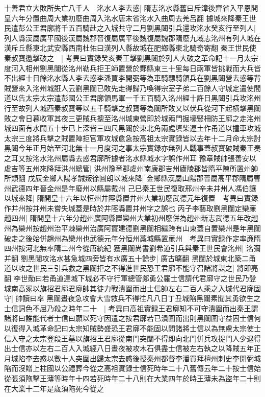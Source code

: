 十善君立大敗所失亡八千人　洺水人李去惑|{
	隋志洺水縣舊曰斥漳後齊省入平恩開皇六年分置曲周大業初廢曲周入洺水唐末省洺水入曲周去羌呂翻}
據城來降秦王世民遣彭公王君廓將千五百騎赴之入城共守二月劉黑闥引兵還攻洺水癸亥行至列人|{
	列人縣漢屬廣平國後漢屬魏郡晉復屬廣平後魏復屬魏郡隋廢九域志洺州有列人城在漢斥丘縣東北武安縣西南杜佑曰漢列人縣故城在肥鄉縣東北騎奇寄翻}
秦王世民使秦叔寶邀擊破之　|{
	考異曰實録癸亥秦王擊劉黑闥於列人大破之革命記十一月太宗度河入相州劉黑闥從洺州勒兵拒王師置營於鄴縣東三十里每日兩軍皆挑戰而大兵皆不出經十日餘洺水縣人李去惑李潘買李開弼等為車騎驃騎領兵在劉黑闥營去惑等背賊營來入洺州城誑人云劉黑闥已敗先走得歸乃喚得宗室子弟二百餘人守城定遣使間道以告太宗太宗遣彭國公王君廓領馬軍一千五百騎入洺州經十許日黑闥引兵攻洺州行至故列人城西秦叔寶等以五千騎擊之叔寶等為闥所敗又以伏兵從河下起横擊黑闥敗之會日暮收軍其夜三更賊兵摠至洺州城東營即於城兩門掘壕豎柵防王廓之走洺州城四面有水闊五十步已上深皆三四尺黑闥於東北角兩處填柴運土作甬道以撞車攻城太宗三度將兵擊之賊置陣拒官軍攻城愈急按高祖太宗實録皆以去年十二月命太宗討黑闥今年正月始至河北無十一月度河之事太宗實録亦無列人戰事蓋叔寶破賊秦王奏之耳又按洺水洺州屬縣去惑君廓所據者洺水縣城水字誤作州耳}
豫章賊帥張善安以䖍吉等五州來降拜洪州總管|{
	洪州豫章郡䖍州南康郡吉州廬陵郡皆隋平陳所置州帥所類翻}
戊辰金鄉人陽孝誠叛徐圓朗以城來降|{
	金鄉縣漢屬山陽郡晉屬高平郡隋屬曹州武德四年晉金州是年廢州以縣屬戴州}
己巳秦王世民復取邢州辛未井州人馮伯讓以城來降|{
	隋開皇十六年以恒州井陘縣置井州大業初廢武德元年復置　考異曰實録作并州按并州未嘗失城蓋是時於井陘縣置井州字之誤也}
丙子李藝取劉黑闥定欒亷趙四州|{
	隋開皇十六年分趙州廣阿縣置欒州大業初州廢併為趙州新志武德五年改趙州為欒州按趙州治平棘欒州治廣阿竇建德劉黑闥相繼跨有山東蓋自置欒州是年黑闥破走之後始併趙州為欒州也武德元年分恒州藁城縣置亷州　考異曰實録作定率亷隋四州按河北無率隋二州今從唐統紀}
獲黑闥尚書劉希道引兵與秦王世民會洺州|{
	洺彌并翻}
劉黑闥攻洺水甚急城四旁皆有水廣五十餘步|{
	廣古曠翻}
黑闥於城東北築二甬道以攻之世民三引兵救之黑闥拒之不得進世民恐王君廓不能守召諸將謀之|{
	將即亮翻}
李世勣曰若甬道達城下城必不守行軍總管郯勇公羅士信請代君廓守之世民乃登城南高冢以旗招君廓君廓帥其徒力戰潰圍而出士信帥左右二百人乘之入城代君廓固守|{
	帥讀曰率}
黑闥晝夜急攻會大雪救兵不得往凡八日丁丑城陷黑闥素聞其勇欲生之士信詞色不屈乃殺之時年二十　|{
	考異曰高祖實録王君廓知不可守潰圍而出秦王謂諸將曰誰能代者士信曰願以死守因遣之按君廓若已潰圍而出則黑闥圍守益固士信何以復得入城革命記曰太宗知賊勢盛恐王君廓不能固以問諸將士信以為無慮太宗使士信入守之太宗登段王墓以旗招王君廓從南門突闈不得即向北門併兵攻捉門人少退得出士信亦以左右二百人入城經八日晝夜被攻木石俱盡士信被左右執之以降賊五年正月城陷李去惑以數十人突圍出歸太宗去惑後授秦州都督李潘買拜檀州刺史李開弼城陷而沒贈上柱國以公禮葬今從之高祖實録士信死時年二十八舊傳云年二十按士信始從張須陁擊王薄等時年十四若死時年二十八則在大業四年於時王薄未為盜年二十則在大業十二年是歲須陁死今從之}
